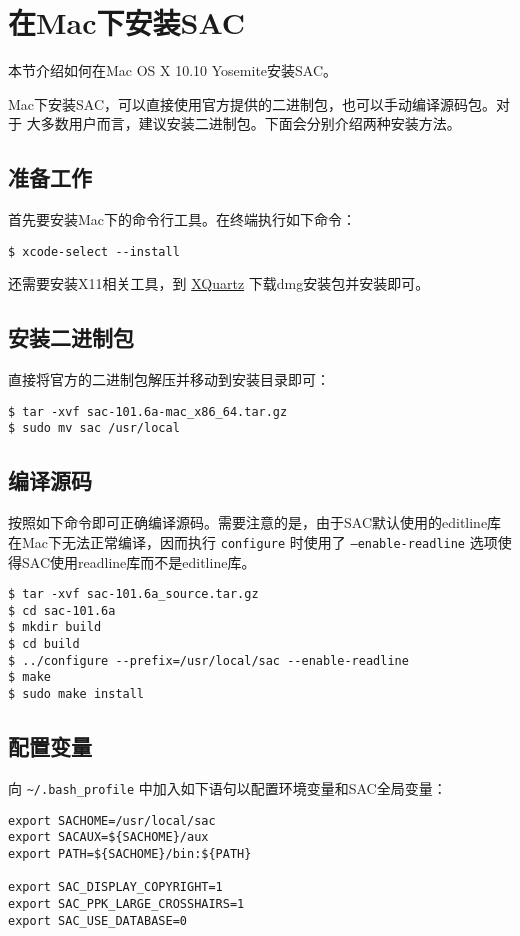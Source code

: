 \section{在Mac下安装SAC}
\label{sec:sac-install-for-mac}
本节介绍如何在Mac OS X 10.10 Yosemite安装SAC。

Mac下安装SAC，可以直接使用官方提供的二进制包，也可以手动编译源码包。对于
大多数用户而言，建议安装二进制包。下面会分别介绍两种安装方法。

\subsection{准备工作}
首先要安装Mac下的命令行工具。在终端执行如下命令：
\begin{verbatim}
$ xcode-select --install
\end{verbatim}
还需要安装X11相关工具，到 \href{http://xquartz.macosforge.org/landing/}{XQuartz}
下载dmg安装包并安装即可。

\subsection{安装二进制包}
直接将官方的二进制包解压并移动到安装目录即可：
\begin{verbatim}
$ tar -xvf sac-101.6a-mac_x86_64.tar.gz
$ sudo mv sac /usr/local
\end{verbatim}

\subsection{编译源码}
按照如下命令即可正确编译源码。需要注意的是，由于SAC默认使用的editline库
在Mac下无法正常编译，因而执行 \texttt{configure} 时使用了
\texttt{--enable-readline} 选项使得SAC使用readline库而不是editline库。
\begin{verbatim}
$ tar -xvf sac-101.6a_source.tar.gz
$ cd sac-101.6a
$ mkdir build
$ cd build
$ ../configure --prefix=/usr/local/sac --enable-readline
$ make
$ sudo make install
\end{verbatim}


\subsection{配置变量}
向 \verb|~/.bash_profile| 中加入如下语句以配置环境变量和SAC全局变量：
\begin{verbatim}
export SACHOME=/usr/local/sac
export SACAUX=${SACHOME}/aux
export PATH=${SACHOME}/bin:${PATH}

export SAC_DISPLAY_COPYRIGHT=1
export SAC_PPK_LARGE_CROSSHAIRS=1
export SAC_USE_DATABASE=0
\end{verbatim}

